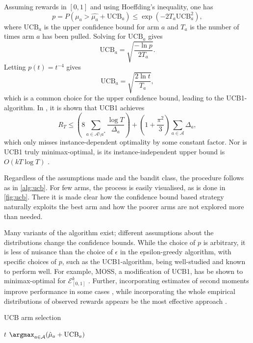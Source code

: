 Assuming rewards in $[0,1]$ and using Hoeffding's inequality, one has
\begin{equation}
    p
    = P(\mu_a > \hat{\mu_a} + \text{UCB}_a)
    \leq \exp(-2T_a \text{UCB}_a^2),
\end{equation}
where $\text{UCB}_a$ is the upper confidence bound for arm $a$ and $T_a$ is the number of times arm $a$ has been pulled.
Solving for $\text{UCB}_a$ gives
\begin{equation}
    \text{UCB}_a = \sqrt{\frac{-\ln p}{2T_a}}.
\end{equation}
Letting $p(t) = t^{-4}$ gives
\begin{equation}
    \text{UCB}_a = \sqrt{\frac{2 \ln t}{T_a}},
\end{equation}
which is a common choice for the upper confidence bound, leading to the UCB1-algorithm.
In \autocite{auer2002}, it is shown that UCB1 achieves
\begin{equation}
    R_T
    \leq
    \left( 8 \sum_{a \in \mathcal{A} \setminus a^*} \frac{\log T}{\Delta_a} \right)
    + \left(1 + \frac{\pi^2}{3}\right) \sum_{a \in \mathcal{A}} \Delta_a,
\end{equation}
which only misses instance-dependent optimality by some constant factor.
Nor is UCB1 truly minimax-optimal, is its instance-independent upper bound is $O(kT \log T)$ \autocite{bubeck2012}.


Regardless of the assumptions made and the bandit class, the procedure follows as in \cref{alg:ucb}.
For few arms, the process is easily visualised, as is done in \cref{fig:ucb}.
There it is made clear how the confidence bound based strategy naturally exploits the best arm and how the poorer arms are not explored more than needed.

Many variants of the algorithm exist; different assumptions about the distributions change the confidence bounds.
While the choice of $p$ is arbitrary, it is less of nuisance than the choice of $\epsilon$ in the epsilon-greedy algorithm, with specific choices of $p$, such as the UCB1-algorithm, being well-studied and known to perform well.
For example, MOSS, a modification of UCB1, has be shown to minimax-optimal for $\mathcal{E}_{[0,1]}^k$ \autocite{audibert2009}.
Further, incorporating estimates of second moments improve performance in some cases \autocite{audibert2009a}, while incorporating the whole empirical distributions of observed rewards appears be the most effective approach \autocite{maillard2011}.

\begin{algorithm}
    \caption{UCB arm selection}
    \label{alg:ucb}
    \begin{algorithmic}
        \State \Return $t$
        \Else
        \State \Return $\argmax_{a \in \mathcal{A}} (\hat{\mu}_a + \text{UCB}_a)$
        \EndIf
    \end{algorithmic}
\end{algorithm}


